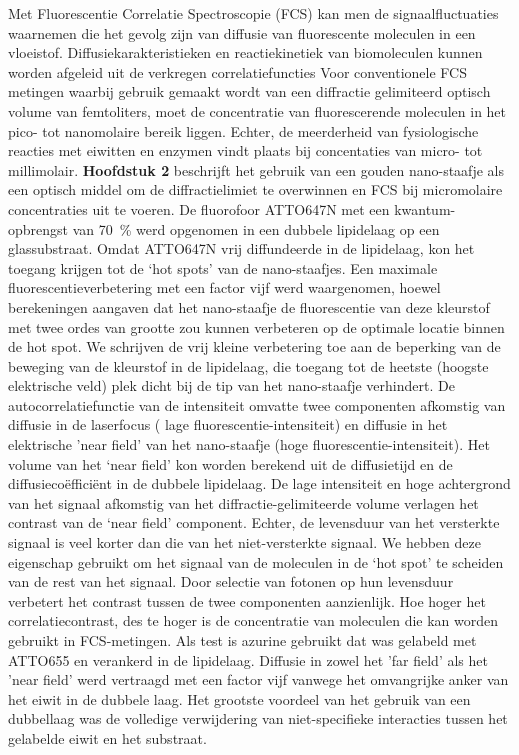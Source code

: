 Met Fluorescentie Correlatie Spectroscopie (FCS) kan men de signaalfluctuaties waarnemen die het gevolg zijn van diffusie van fluorescente moleculen in een vloeistof. Diffusiekarakteristieken en reactiekinetiek van biomoleculen kunnen worden afgeleid uit de verkregen correlatiefuncties Voor conventionele FCS metingen waarbij gebruik gemaakt wordt van een diffractie gelimiteerd optisch volume van femtoliters, moet de concentratie
van fluorescerende moleculen in het pico- tot nanomolaire bereik liggen. Echter, de meerderheid van fysiologische reacties met eiwitten en enzymen vindt plaats bij concentaties van micro- tot millimolair.  \textbf{Hoofdstuk 2} beschrijft het gebruik van een gouden nano-staafje als een optisch middel  om de diffractielimiet te overwinnen en FCS bij micromolaire concentraties uit te voeren. De fluorofoor ATTO647N met een kwantum-opbrengst van \SI{70}{\percent} werd opgenomen in een dubbele lipidelaag op een glassubstraat. Omdat ATTO647N vrij diffundeerde in de lipidelaag, kon het toegang krijgen tot de ‘hot spots’ van de nano-staafjes. Een maximale fluorescentieverbetering met een factor vijf werd waargenomen, hoewel berekeningen aangaven dat het nano-staafje de fluorescentie van deze kleurstof met twee ordes van grootte zou kunnen verbeteren op de optimale locatie binnen de hot spot. We schrijven de vrij kleine verbetering toe aan de beperking van de beweging van de kleurstof in de lipidelaag, die toegang tot de heetste (hoogste elektrische veld) plek dicht bij de tip van het nano-staafje verhindert. De autocorrelatiefunctie van de intensiteit omvatte twee componenten afkomstig van diffusie in de laserfocus ( lage fluorescentie-intensiteit) en diffusie in het elektrische ’near field’  van het nano-staafje (hoge fluorescentie-intensiteit). Het volume van het ‘near field’ kon worden berekend uit de diffusietijd en de diffusiecoëfficiënt in de dubbele lipidelaag. De lage intensiteit en hoge achtergrond van  het signaal afkomstig van het diffractie-gelimiteerde volume verlagen het contrast van de ‘near field’ component. Echter, de levensduur van het versterkte signaal is veel korter dan die van het niet-versterkte signaal. We hebben deze eigenschap gebruikt om het signaal van de moleculen in de ‘hot spot’ te scheiden van de rest van het signaal. Door selectie van fotonen op hun levensduur verbetert het contrast tussen de twee componenten aanzienlijk. Hoe hoger het correlatiecontrast, des te hoger is de concentratie van moleculen die kan worden gebruikt in FCS-metingen. Als test is azurine gebruikt dat was gelabeld met ATTO655 en verankerd in de lipidelaag. Diffusie in zowel het ’far field’  als het ’near field’ werd vertraagd met een factor vijf vanwege het omvangrijke anker van het eiwit in de dubbele laag. Het grootste voordeel van het gebruik van een dubbellaag was de volledige verwijdering van niet-specifieke interacties tussen het gelabelde eiwit en het substraat.
 


